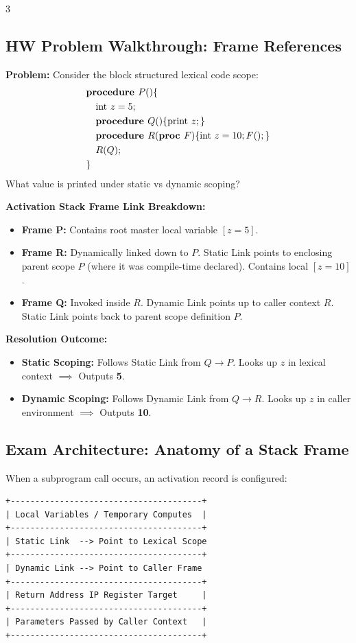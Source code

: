 \documentclass[8.5pt,landscape,a4paper]{article}
\begin{document}
\begin{multicols*}{3}
\subsection{HW Problem Walkthrough: Frame References}
\textbf{Problem:} Consider the block structured lexical code scope:
\begin{align*}
&\text{\bf procedure } P() \{ \\
&\quad \text{int } z = 5; \\
&\quad \text{\bf procedure } Q() \{ \text{print } z; \} \\
&\quad \text{\bf procedure } R(\text{\bf proc } F) \{ \text{int } z = 10; F(); \} \\
&\quad R(Q); \\
&\}
\end{align*}
What value is printed under static vs dynamic scoping?

\textbf{Activation Stack Frame Link Breakdown:}
\begin{itemize}
    \item \textbf{Frame P:} Contains root master local variable $[z = 5]$.
    \item \textbf{Frame R:} Dynamically linked down to $P$. Static Link points to enclosing parent scope $P$ (where it was compile-time declared). Contains local $[z = 10]$.
    \item \textbf{Frame Q:} Invoked inside $R$. Dynamic Link points up to caller context $R$. Static Link points back to parent scope definition $P$.
\end{itemize}
\textbf{Resolution Outcome:}
\begin{itemize}
    \item \textbf{Static Scoping:} Follows Static Link from $Q \rightarrow P$. Looks up $z$ in lexical context $\implies$ Outputs \textbf{5}.
    \item \textbf{Dynamic Scoping:} Follows Dynamic Link from $Q \rightarrow R$. Looks up $z$ in caller environment $\implies$ Outputs \textbf{10}.
\end{itemize}

\subsection{Exam Architecture: Anatomy of a Stack Frame}
When a subprogram call occurs, an activation record is configured:
\begin{verbatim}
+---------------------------------------+
| Local Variables / Temporary Computes  |
+---------------------------------------+
| Static Link  --> Point to Lexical Scope
+---------------------------------------+
| Dynamic Link --> Point to Caller Frame
+---------------------------------------+
| Return Address IP Register Target     |
+---------------------------------------+
| Parameters Passed by Caller Context   |
+---------------------------------------+
\end{verbatim}


\end{multicols*}
\end{document}
